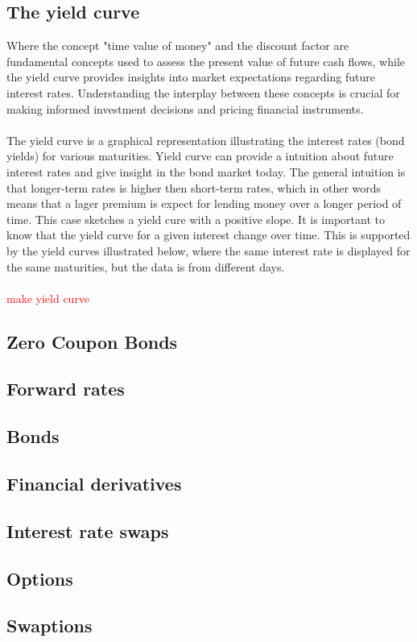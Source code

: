 \subsection{The yield curve}
Where the concept "time value of money" and the discount factor are fundamental concepts used to assess the present value of future
cash flows, while the yield curve provides insights into market expectations regarding future interest rates.
Understanding the interplay between these concepts is crucial for making informed investment decisions and pricing
financial instruments.
\\\\
The yield curve is a graphical representation illustrating the interest rates (bond yields) for various maturities.
Yield curve can provide a intuition about future interest rates and give insight in the bond market today. 
The general intuition is that longer-term rates is higher then short-term rates, which in other words means that a
lager premium is expect for lending money over a longer period of time. This case sketches a yield cure with a 
positive slope. It is important to know that the yield curve for a given interest change over time. This is supported
by the yield curves illustrated below, where the same interest rate is displayed for the same maturities, but the 
data is from different days. 
\\\\
\textcolor{red}{make yield curve}

\subsection{Zero Coupon Bonds}

\subsection{Forward rates}

\subsection{Bonds}

\subsection{Financial derivatives}

\subsection{Interest rate swaps}

\subsection{Options}

\subsection{Swaptions}